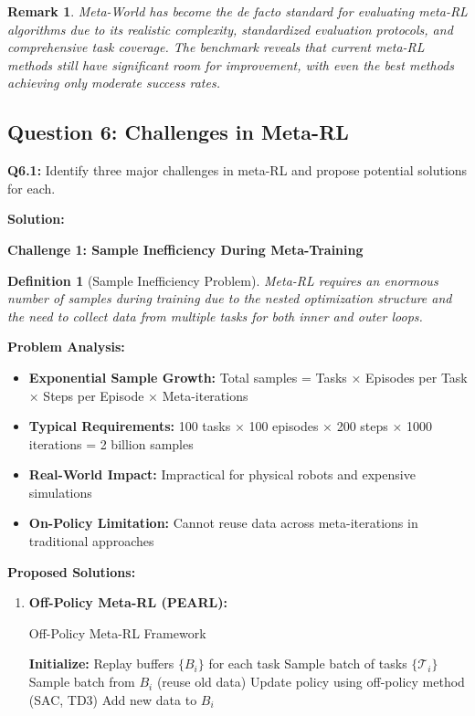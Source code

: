 \documentclass[12pt]{article}
\newcommand{\ieee}[1]{\textcolor{IEEEBlue}{\textbf{#1}}}
\newtheorem{definition}{Definition}
\newtheorem{remark}{Remark}
\begin{document}
{{			\begin{remark}
			Meta-World has become the de facto standard for evaluating meta-RL algorithms due to its realistic complexity, standardized evaluation protocols, and comprehensive task coverage. The benchmark reveals that current meta-RL methods still have significant room for improvement, with even the best methods achieving only moderate success rates.
			\end{remark}
			
			\subsection{Question 6: Challenges in Meta-RL}
			
			\textbf{Q6.1:} Identify three major challenges in meta-RL and propose potential solutions for each.
			
			\textbf{Solution:}
			
			\ieee{Challenge 1: Sample Inefficiency During Meta-Training}
			
			\begin{definition}[Sample Inefficiency Problem]
			Meta-RL requires an enormous number of samples during training due to the nested optimization structure and the need to collect data from multiple tasks for both inner and outer loops.
			\end{definition}
			
			\textbf{Problem Analysis:}
			
			\begin{itemize}
				\item \textbf{Exponential Sample Growth:} Total samples = Tasks × Episodes per Task × Steps per Episode × Meta-iterations
				\item \textbf{Typical Requirements:} 100 tasks × 100 episodes × 200 steps × 1000 iterations = 2 billion samples
				\item \textbf{Real-World Impact:} Impractical for physical robots and expensive simulations
				\item \textbf{On-Policy Limitation:} Cannot reuse data across meta-iterations in traditional approaches
			\end{itemize}
			
			\textbf{Proposed Solutions:}
			
			\begin{enumerate}
				\item \textbf{Off-Policy Meta-RL (PEARL):}
				
				\begin{algorithm}[H]
				\caption{Off-Policy Meta-RL Framework}
				\begin{algorithmic}[1]
				\STATE \textbf{Initialize:} Replay buffers $\{B_i\}$ for each task
				\STATE Sample batch of tasks $\{\mathcal{T}_i\}$
				\STATE Sample batch from $B_i$ (reuse old data)
				\STATE Update policy using off-policy method (SAC, TD3)
				\STATE Add new data to $B_i$
				\ENDFOR
				\ENDWHILE
				\end{algorithmic}
				\end{algorithm}
				

\end{enumerate}}}
\end{document}
